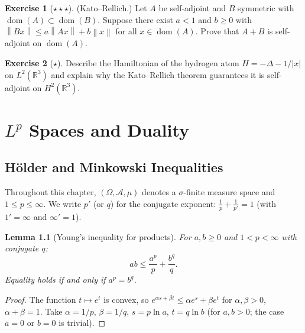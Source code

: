 \documentclass[a4paper,12pt]{book}
\DeclareMathOperator{\dom}{dom}
\newcommand{\R}{\mathbb{R}}
\newcommand{\norm}[1]{\left\| #1 \right\|}
\newcommand{\abs}[1]{\left| #1 \right|}
\theoremstyle{definition}
\newtheorem{exercise}{Exercise}[chapter]
\theoremstyle{plain}
\newtheorem{lemma}[definition]{Lemma}
\theoremstyle{remark}
\begin{document}
\begin{exercise}[$\star\star\star$]\label{exo:kato-rellich}
(Kato--Rellich.) Let $A$ be self-adjoint and $B$ symmetric with $\dom(A) \subset \dom(B)$.
Suppose there exist $a < 1$ and $b \ge 0$ with $\norm{Bx} \le a\norm{Ax} + b\norm{x}$
for all $x \in \dom(A)$. Prove that $A + B$ is self-adjoint on $\dom(A)$.
\end{exercise}

\begin{exercise}[$\star$]\label{exo:hydrogen-atom}
Describe the Hamiltonian of the hydrogen atom $H = -\Delta - 1/\abs{x}$ on
$L^2(\R^3)$ and explain why the Kato--Rellich theorem guarantees it is
self-adjoint on $H^2(\R^3)$.
\end{exercise}


\chapter{$L^p$ Spaces and Duality}\label{ch:Lp-duality}
\minitoc

\section{H\"older and Minkowski Inequalities}\label{sec:holder-minkowski}


Throughout this chapter, $(\Omega, \mathcal{A}, \mu)$ denotes a $\sigma$-finite
measure space and $1 \le p \le \infty$. We write $p'$ (or $q$) for the conjugate
exponent: $\frac{1}{p} + \frac{1}{p'} = 1$ (with
$1' = \infty$ and $\infty' = 1$).

\begin{lemma}[Young's inequality for products]\label{lem:young-ineq}
For $a, b \ge 0$ and $1 < p < \infty$ with conjugate $q$:
\[
  ab \le \frac{a^p}{p} + \frac{b^q}{q}.
\]
Equality holds if and only if $a^p = b^q$.
\end{lemma}

\begin{proof}
The function $t \mapsto e^t$ is convex, so
$e^{\alpha s + \beta t} \le \alpha e^s + \beta e^t$ for $\alpha, \beta > 0$,
$\alpha + \beta = 1$. Take $\alpha = 1/p$, $\beta = 1/q$, $s = p\ln a$,
$t = q\ln b$ (for $a, b > 0$; the case $a = 0$ or $b = 0$ is trivial).
\end{proof}
\end{document}
